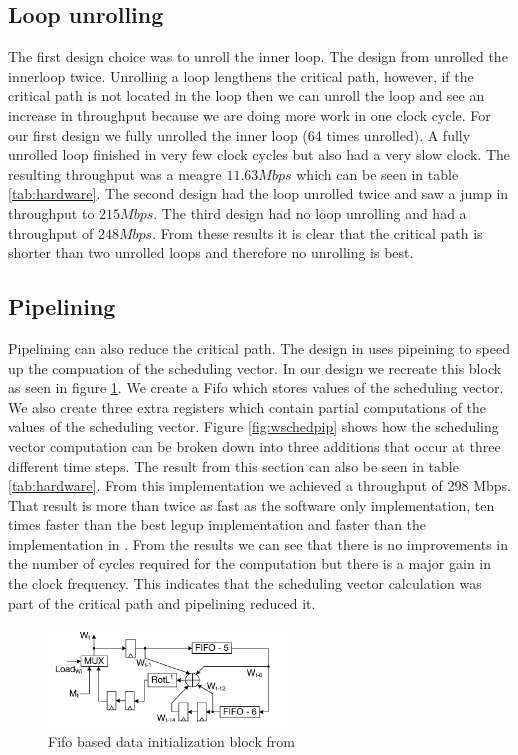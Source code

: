 \documentclass[conference]{IEEEtran}
\begin{document}
\subsection{Loop unrolling}
The first design choice was to unroll the inner loop. The design from \cite{michail} unrolled the innerloop twice. Unrolling a loop lengthens the critical path, however, if the critical path is not located in the loop then we can unroll the loop and see an increase in throughput because we are doing more work in one clock cycle. For our first design we fully unrolled the inner loop (64 times unrolled). A fully unrolled loop finished in very few clock cycles but also had a very slow clock. The resulting throughput was a meagre $11.63 Mbps$ which can be seen in table \ref{tab:hardware}. The second design had the loop unrolled twice and saw a jump in throughput to $215 Mbps$. The third design had no loop unrolling and had a throughput of $248 Mbps$. From these results it is clear that the critical path is shorter than two unrolled loops and therefore no unrolling is best. 


\subsection{Pipelining}
Pipelining can also reduce the critical path. The design in \cite{ceshar} uses pipeining to speed up the compuation of the scheduling vector. In our design we recreate this block as seen in figure \ref{fig:fifosched}. We create a Fifo which stores values of the scheduling vector. We also create three extra registers which contain partial computations of the values of the scheduling vector. Figure \ref{fig:wschedpip} shows how the scheduling vector computation can be broken down into three additions that occur at three different time steps. The result from this section can also be seen in table \ref{tab:hardware}. From this implementation we achieved a throughput of 298 Mbps. That result is more than twice as fast as the software only implementation, ten times faster than the best legup implementation and faster than the implementation in \cite{sklav}. From the results we can see that there is no improvements in the number of cycles required for the computation but there is a major gain in the clock frequency. This indicates that the scheduling vector calculation was part of the critical path and pipelining reduced it.


\begin{figure}[!t]
\centering
\includegraphics[width=2.5in]{fifosched}
\caption{Fifo based data initialization block from \cite{ceshar} }
\label{fig:fifosched}
\end{figure}
\end{document}
